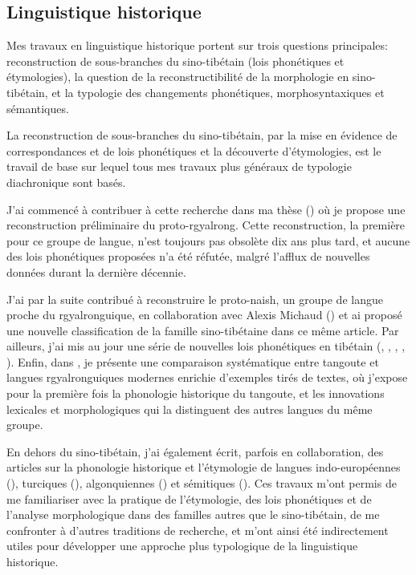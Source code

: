 \documentclass[oldfontcommands,oneside,a4paper,11pt]{article}
\begin{document}
\subsection{Linguistique historique}  \label{sec:diachronie}
Mes travaux en linguistique historique portent sur trois questions principales: reconstruction de sous-branches du sino-tibétain (lois phonétiques et étymologies), la question de la reconstructibilité de la morphologie en sino-tibétain, et la typologie des changements phonétiques, morphosyntaxiques et sémantiques.
 
La reconstruction de sous-branches du sino-tibétain, par la mise en évidence de correspondances et de lois phonétiques et la découverte d'étymologies, est le travail de base sur lequel tous mes travaux plus généraux de typologie diachronique sont basés. 

J'ai commencé à contribuer à cette recherche dans ma thèse (\citealt{jacques04these}) où je propose une reconstruction préliminaire du proto-rgyalrong. Cette reconstruction, la première pour ce groupe de langue,   n'est toujours pas obsolète dix ans plus tard, et aucune des lois phonétiques proposées n'a été réfutée, malgré l'afflux de nouvelles données durant la dernière décennie. 

J'ai par la suite contribué à reconstruire le proto-naish, un groupe de langue proche du rgyalronguique, en collaboration avec Alexis Michaud (\citealt{jacques.michaud11naish}) et ai proposé une nouvelle classification de la famille sino-tibétaine dans ce même article. Par ailleurs, j'ai  mis au jour une série de nouvelles lois phonétiques en tibétain (\citealt{jacques09wazur},   \citealt{jacques09e},  \citealt{jacques12internal},   \citealt{jacques13yod}, \citealt{jacques14snom}). Enfin, dans  \citet{jacques14esquisse}, je présente une comparaison systématique entre tangoute et langues rgyalronguiques modernes enrichie d'exemples tirés de textes, où j'expose pour la première fois la phonologie historique du tangoute, et les innovations lexicales et morphologiques qui la distinguent des autres langues du même groupe.

En dehors du sino-tibétain, j'ai également écrit, parfois en collaboration, des articles sur la phonologie historique et l'étymologie de langues indo-européennes (\citealt{jacques13vama}),   turciques (\citealt{antonov12kumush}), algonquiennes (\citealt{jacques13arapaho}) et sémitiques (\citealt{rg-gj12yod}). Ces travaux m'ont permis de me familiariser avec la pratique de l'étymologie, des lois phonétiques et de l'analyse morphologique dans des familles autres que le sino-tibétain, de me confronter à d'autres traditions de recherche, et m'ont ainsi été indirectement utiles pour développer une approche plus typologique de la linguistique historique.
\end{document}
